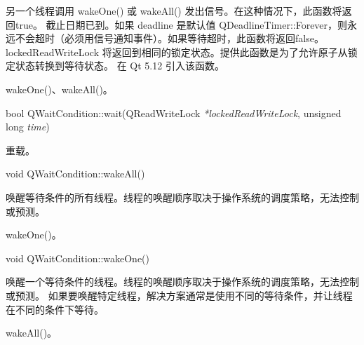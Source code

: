 另一个线程调用 wakeOne() 或 wakeAll() 发出信号。在这种情况下，此函数将返回true。
截止日期已到。如果 deadline 是默认值 QDeadlineTimer::Forever，则永远不会超时（必须用信号通知事件）。如果等待超时，此函数将返回false。
lockedReadWriteLock 将返回到相同的锁定状态。提供此函数是为了允许原子从锁定状态转换到等待状态。
在 Qt 5.12 引入该函数。


\begin{notice}[另请参阅]
wakeOne()、wakeAll()。
\end{notice}


bool QWaitCondition::wait(QReadWriteLock \emph{*lockedReadWriteLock}, unsigned long \emph{time})

重载。

void QWaitCondition::wakeAll()

唤醒等待条件的所有线程。线程的唤醒顺序取决于操作系统的调度策略，无法控制或预测。




\begin{notice}[另请参阅]
wakeOne()。
\end{notice}

void QWaitCondition::wakeOne()

唤醒一个等待条件的线程。线程的唤醒顺序取决于操作系统的调度策略，无法控制或预测。
如果要唤醒特定线程，解决方案通常是使用不同的等待条件，并让线程在不同的条件下等待。

\begin{notice}[另请参阅]
wakeAll()。
\end{notice}

